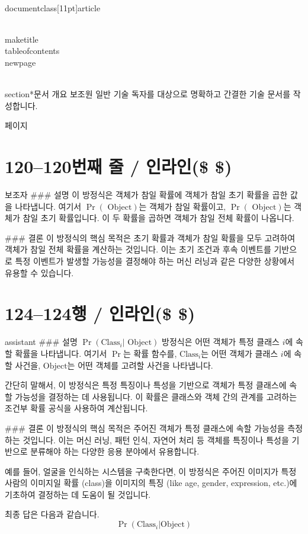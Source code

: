 \\documentclass[11pt]{article}
\begin{document}
\\maketitle
\\tableofcontents
\\newpage

\\section*{문서 개요}
보조원
일반 기술 독자를 대상으로 명확하고 간결한 기술 문서를 작성합니다.

\새 페이지

\section*{120–120번째 줄 / 인라인(\$ \$)}
보조자
### 설명
이 방정식은 객체가 참일 확률에 객체가 참일 초기 확률을 곱한 값을 나타냅니다. 여기서 \(\Pr(\textrm{ Object})\)는 객체가 참일 확률이고, \(\Pr(\textrm{ Object})\)는 객체가 참일 초기 확률입니다. 이 두 확률을 곱하면 객체가 참일 전체 확률이 나옵니다.

### 결론
이 방정식의 핵심 목적은 초기 확률과 객체가 참일 확률을 모두 고려하여 객체가 참일 전체 확률을 계산하는 것입니다. 이는 초기 조건과 후속 이벤트를 기반으로 특정 이벤트가 발생할 가능성을 결정해야 하는 머신 러닝과 같은 다양한 상황에서 유용할 수 있습니다.

\section*{124–124행 / 인라인(\$ \$)}
assistant
### 설명
\(\Pr(\textrm{Class}_i | \textrm{ Object})\) 방정식은 어떤 객체가 특정 클래스 \(i\)에 속할 확률을 나타냅니다. 여기서 \(\Pr\)는 확률 함수를, \(\textrm{Class}_i\)는 어떤 객체가 클래스 \(i\)에 속할 사건을, \(\textrm{Object}\)는 어떤 객체를 고려할 사건을 나타냅니다.

간단히 말해서, 이 방정식은 특정 특징이나 특성을 기반으로 객체가 특정 클래스에 속할 가능성을 결정하는 데 사용됩니다. 이 확률은 클래스와 객체 간의 관계를 고려하는 조건부 확률 공식을 사용하여 계산됩니다.

### 결론
이 방정식의 핵심 목적은 주어진 객체가 특정 클래스에 속할 가능성을 측정하는 것입니다. 이는 머신 러닝, 패턴 인식, 자연어 처리 등 객체를 특징이나 특성을 기반으로 분류해야 하는 다양한 응용 분야에서 유용합니다.

예를 들어, 얼굴을 인식하는 시스템을 구축한다면, 이 방정식은 주어진 이미지가 특정 사람의 이미지일 확률 (class)을 이미지의 특징 (like age, gender, expression, etc.)에 기초하여 결정하는 데 도움이 될 것입니다.

최종 답은 다음과 같습니다.
\[
\boxed{\Pr(\textrm{Class}_i | \textrm{Object})}
\]
\end{document}
